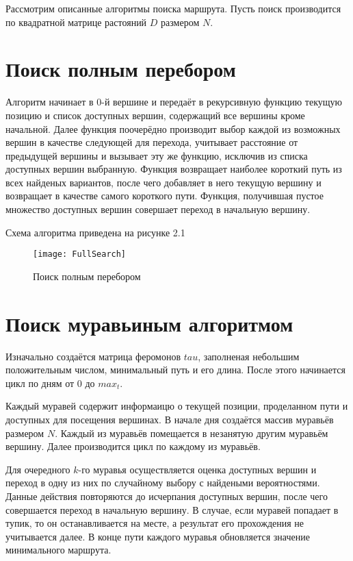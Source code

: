Рассмотрим описанные алгоритмы поиска маршрута. Пусть поиск производится по квадратной матрице растояний $D$ размером $N$.

\section{Поиск полным перебором}
Алгоритм начинает в 0-й вершине и передаёт в рекурсивную функцию текущую позицию и список доступных вершин, содержащий все вершины кроме начальной. Далее функция поочерёдно производит выбор каждой из возможных вершин в качестве следующей для перехода, учитывает расстояние от предыдущей вершины и вызывает эту же функцию, исключив из списка доступных вершин выбранную. Функция возвращает наиболее короткий путь из всех найденых вариантов, после чего добавляет в него текущую вершину и возвращает в качестве самого короткого пути. Функция, получившая пустое множество доступных вершин совершает переход в начальную вершину.

Схема алгоритма приведена на рисунке 2.1
\begin{figure}[h]
	\begin{center}
		{\texttt{[image: FullSearch]}}
		\caption{Поиск полным перебором}
	\end{center}
\end{figure}

\section{Поиск муравьиным алгоритмом}
Изначально создаётся матрица феромонов $tau$, заполненая небольшим положительным числом, минимальный путь и его длина. После этого начинается цикл по дням от 0 до $max_t$.

Каждый муравей содержит информаицю о текущей позиции, проделанном пути и доступных для посещения вершинах. В начале дня создаётся массив муравьёв размером $N$. Каждый из муравьёв помещается в незанятую другим муравьём вершину. Далее производится цикл по каждому из муравьёв.

Для очередного $k$-го муравья осуществляется оценка доступных вершин и переход в одну из них по случайному выбору с найдеными вероятностями. Данные действия повторяются до исчерпания доступных вершин, после чего совершается переход в начальную вершину. В случае, если муравей попадает в тупик, то он останавливается на месте, а результат его прохождения не учитывается далее. В конце пути каждого муравья обновляется значение минимального маршрута.

